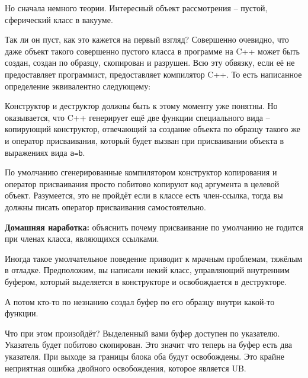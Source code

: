 \documentclass[a4paper,12pt,oneside]{article}
\begin{document}
Но сначала немного теории. Интересный объект рассмотрения -- пустой, сферический класс в вакууме.



Так ли он пуст, как это кажется на первый взгляд? Совершенно очевидно, что даже объект такого совершенно пустого класса в программе на C++ может быть создан, создан по образцу, скопирован и разрушен. Всю эту обвязку, если её не предоставляет программист, предоставляет компилятор C++. То есть написанное определение эквивалентно следующему:



Конструктор и деструктор должны быть к этому моменту уже понятны. Но оказывается, что C++ генерирует ещё две функции специального вида – копирующий конструктор, отвечающий за создание объекта по образцу такого же и оператор присваивания, который будет вызван при присваивании объекта в выражениях вида \lstinline!a=b!.



По умолчанию сгенерированные компилятором конструктор копирования и оператор присваивания просто побитово копируют код аргумента в целевой объект. Разумеется, это не пройдёт если в классе есть член-ссылка, тогда вы должны писать оператор присваивания самостоятельно.

\textbf{Домашняя наработка:} объяснить почему присваивание по умолчанию не годится при членах класса, являющихся ссылками.

Иногда такое умолчательное поведение приводит к мрачным проблемам, тяжёлым в отладке. Предположим, вы написали некий класс, управляющий внутренним буфером, который выделяется в конструкторе и освобождается в деструкторе.



А потом кто-то по незнанию создал буфер по его образцу внутри какой-то функции.



Что при этом произойдёт? Выделенный вами буфер доступен по указателю. Указатель будет побитово скопирован. Это значит что теперь на буфер есть два указателя. При выходе за границы блока оба будут освобождены. Это крайне неприятная ошибка двойного освобождения, которое является UB.
\end{document}
